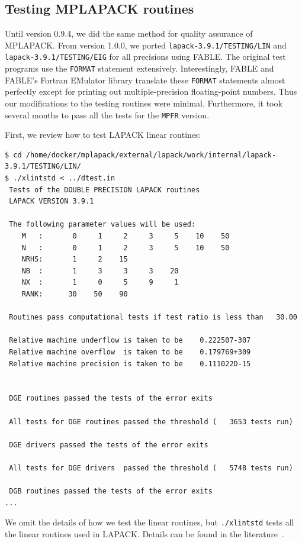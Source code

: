 \documentclass[12pt]{article}
\begin{document}
\subsection{Testing MPLAPACK routines}
Until version 0.9.4, we did the same method for quality assurance of MPLAPACK. From version 1.0.0, we ported {\tt lapack-3.9.1/TESTING/LIN} and {\tt lapack-3.9.1/TESTING/EIG} for all precisions using FABLE. The original test programs
use the {\tt FORMAT} statement extensively. Interestingly, FABLE and FABLE's Fortran EMulator library translate these {\tt FORMAT} statements almost perfectly except for printing out multiple-precision floating-point numbers. Thus our modifications to the testing routines were minimal. Furthermore, it took several months to pass all the tests for the {\tt MPFR} version.

First, we review how to test LAPACK linear routines:
\begin{verbatim}
$ cd /home/docker/mplapack/external/lapack/work/internal/lapack-3.9.1/TESTING/LIN/
$ ./xlintstd < ../dtest.in
 Tests of the DOUBLE PRECISION LAPACK routines
 LAPACK VERSION 3.9.1

 The following parameter values will be used:
    M   :       0     1     2     3     5    10    50
    N   :       0     1     2     3     5    10    50
    NRHS:       1     2    15
    NB  :       1     3     3     3    20
    NX  :       1     0     5     9     1
    RANK:      30    50    90

 Routines pass computational tests if test ratio is less than   30.00

 Relative machine underflow is taken to be    0.222507-307
 Relative machine overflow  is taken to be    0.179769+309
 Relative machine precision is taken to be    0.111022D-15


 DGE routines passed the tests of the error exits

 All tests for DGE routines passed the threshold (   3653 tests run)

 DGE drivers passed the tests of the error exits

 All tests for DGE drivers  passed the threshold (   5748 tests run)

 DGB routines passed the tests of the error exits
...
\end{verbatim}
We omit the details of how we test the linear routines, but {\tt ./xlintstd} tests all the linear routines used in LAPACK.
Details can be found in the literature~\cite{lawn41}.
\end{document}
